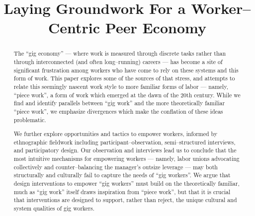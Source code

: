 \documentclass{sigchi}
\def\plaintitle{Laying Groundwork For a Worker--Centric Peer Economy}
\def\emptyauthor{Anonymous for Review}
\begin{document}
\title{\plaintitle}

\author{
}
 \author{ \alignauthor{\emptyauthor} }
\maketitle

\begin{abstract}
The ``gig economy''
--- where work is measured through discrete tasks rather than through interconnected (and often long--running) careers ---
has become a site of significant frustration among workers who have come to rely on these systems and this form of work.
This paper explores some of the sources of that stress,
and attempts to relate this seemingly nascent work style to more familiar forms of labor
--- namely, ``piece work'',
a form of work which emerged at the dawn of the 20th century.
While we find and identify parallels between ``gig work'' and the more theoretically familiar ``piece work'',
we emphasize divergences which make the conflation of these ideas problematic.

We further explore opportunities and tactics to empower workers,
informed by ethnographic fieldwork including participant--observation,
semi--structured interviews,
and participatory design.
Our observation and interviews lead us to conclude that the most intuitive mechanisms for empowering workers
--- namely, labor unions advocating collectively and counter--balancing the manager's outsize leverage ---
may both structurally and culturally fail to capture the needs of ``gig workers''.
We argue that design interventions to empower ``gig workers'' must build on the theoretically familiar,
much as ``gig work'' itself draws inspiration from ``piece work'',
but that it is crucial that interventions are designed to support,
rather than reject,
the unique cultural and system qualities of gig workers.
\end{abstract}
\end{document}
